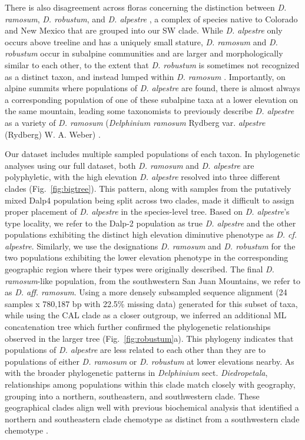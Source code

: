 \documentclass[11pt]{article}
\begin{document}
There is also disagreement across floras concerning the distinction between \emph{D. ramosum}, \emph{D. robustum}, and \emph{D. alpestre}
\citep{ewan_synopsis_1945,ackerfield_flora_2022,WeberWittmann2012},
a complex of species native to Colorado and New Mexico that are grouped into our SW clade.
% 
While \emph{D. alpestre} only occurs above treeline and has a uniquely small stature, \emph{D. ramosum} and \emph{D. robustum} occur in subalpine communities and are larger and morphologically similar to each other, to the extent that \emph{D. robustum} is sometimes not recognized as a distinct taxon, and instead lumped within \emph{D. ramosum} \cite[e.g.,][]{ackerfield_flora_2022}. Importantly, on alpine summits where populations of \emph{D. alpestre} are found, there is almost always a corresponding population of one of these subalpine taxa at a lower elevation on the same mountain, leading some taxonomists to previously describe \emph{D. alpestre} as a variety of \emph{D. ramosum} (\emph{Delphinium ramosum} Rydberg var. \emph{alpestre} (Rydberg) W. A. Weber) \citep{warnock_taxonomic_1995}.


Our dataset includes multiple sampled populations of each taxon. 
% 
In phylogenetic analyses using our full dataset, both \emph{D. ramosum} and 
\emph{D. alpestre} are polyphyletic, with the high elevation \emph{D. alpestre}
resolved into three different clades (Fig.~\ref{fig:bigtree}). This pattern, along with samples from the putatively mixed Dalp4 population being split across two clades, made it difficult to assign proper placement of \emph{D. alpestre} in the species-level tree. Based on \emph{D. alpestre}'s type locality, we refer to the Dalp-2 population as true \emph{D. alpestre} and the other populations exhibiting the distinct high elevation diminutive phenotype as \emph{D. cf. alpestre}.
Similarly, we use the designations \emph{D. ramosum} and \emph{D. robustum} for
the two populations exhibiting the lower elevation phenotype in the corresponding 
geographic region where their types were originally described. 
The final \emph{D. ramosum}-like population, from the southwestern San Juan Mountains, we refer to as \emph{D. aff. ramosum}.
% 
Using a more densely subsampled sequence alignment (24 samples x 780,187 bp with 22.5\% missing data) generated for this subset of taxa, while using the CAL clade as a closer outgroup, we inferred an additional ML concatenation tree which further confirmed the phylogenetic relationships observed in the larger tree (Fig.~\ref{fig:robustum}a).
% 
This phylogeny indicates that populations of \emph{D. alpestre} are less related to each other than they are to populations of either \emph{D. ramosum} or \emph{D. robustum} at lower elevations nearby. As with the broader phylogenetic patterns in \emph{Delphinium} sect. \emph{Diedropetala}, relationships among populations within this clade match closely with geography, grouping into a northern, southeastern, and southwestern clade. These geographical clades align well with previous biochemical analysis that identified a northern and southeastern clade chemotype as distinct from a southwestern clade chemotype \citep{cook_two_2017}.  
\end{document}
